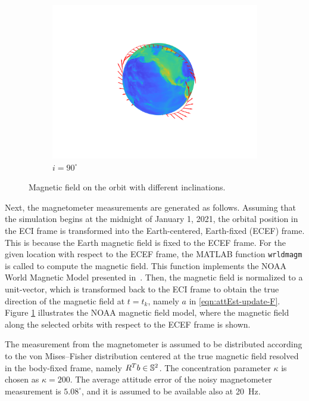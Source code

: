 \begin{figure}
\begin{subfigure}[b]{0.28\textwidth}
		\includegraphics[trim={4.5cm 2.5cm 4cm 2.5cm},clip,width=1\textwidth]{figures/attEst-sim3-mag_90.png}
		\caption{$i=90^\circ$}
	\end{subfigure}
	\caption{Magnetic field on the orbit with different inclinations.}
	\label{fig:attEst-sim3-magnetic}
\end{figure}

Next, the magnetometer measurements are generated as follows. 
Assuming that the simulation begins at the midnight of January 1, 2021, the orbital position in the ECI frame is transformed into the Earth-centered, Earth-fixed (ECEF) frame. 
This is because the Earth magnetic field is fixed to the ECEF frame. 
For the given location with respect to the ECEF frame, the MATLAB function \texttt{wrldmagm} is called to compute the magnetic field.  
This function implements the NOAA World Magnetic Model presented in~\cite{chulliat2020us}. 
Then, the magnetic field is normalized to a unit-vector, which is transformed back to the ECI frame to obtain the true direction of the magnetic field at $t=t_k$, namely $a$ in \eqref{eqn:attEst-update-F}.
Figure \ref{fig:attEst-sim3-magnetic} illustrates the NOAA magnetic field model, where the magnetic field along the selected orbits with respect to the ECEF frame is shown.

The measurement from the magnetometer is assumed to be distributed according to the von Mises--Fisher distribution centered at the true magnetic field resolved in the body-fixed frame, namely $R^Tb\in\mathbb{S}^2$.
The concentration parameter $\kappa$ is chosen as $\kappa=200$. 
The average attitude error of the noisy magnetometer measurement is $5.08^\circ$, and it is assumed to be available also at \SI{20}{\hertz}.

